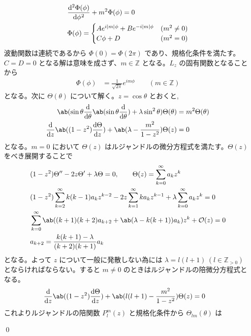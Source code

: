 \documentclass[uplatex,dvipdfmx,a4paper,11pt]{jlreq}
\makeatletter
\newcommand{\ZZ}{\mathbb{Z}}
\theoremstyle{definition}
\renewenvironment{proof}[1][\proofname]{\par
  \normalfont
  \topsep6\p@\@plus6\p@ \trivlist
  \item[\hskip\labelsep{\bfseries #1}\@addpunct{\bfseries}]\ignorespaces\quad\par
}{%
  \qed\endtrivlist\@endpefalse
}
\renewcommand\proofname{証明}
\makeatother
\begin{document}
\begin{proof}
  \begin{align}
     & \diff[2]{\Phi(\phi)}{\phi} + m^2\Phi(\phi) = 0             \\
     & \Phi(\phi) = \begin{cases}
                      Ae^{i|m|\phi} + Be^{-i|m|\phi} & (m^2 \neq 0) \\
                      C\phi + D                      & (m^2 = 0)    \\
                    \end{cases}
  \end{align}
  波動関数は連続であるから $\Phi(0) = \Phi(2\pi)$ であり、規格化条件を満たす。$C = D = 0$ となる解は意味を成さず、$m\in\ZZ$ となる。$L_z$ の固有関数となることから
  \begin{align}
    \Phi(\phi) & = \frac{1}{\sqrt{2\pi}}e^{im\phi} \qquad (m\in\ZZ)
  \end{align}
  となる。次に $\Theta(\theta)$ について解く。$z = \cos\theta$ とおくと,
  \begin{align}
    \ab(\sin\theta\diff{}{\theta}\ab(\sin\theta\diff{}{\theta}) + \lambda \sin^2\theta)\Theta(\theta) & = m^2\Theta(\theta) \\
    \diff{}{z}\ab((1 - z^2)\diff{\Theta}{z}) + \ab(\lambda - \frac{m^2}{1 - z^2})\Theta(z)            & = 0
  \end{align}
  となる。$m = 0$ において $\Theta(z)$ はルジャンドルの微分方程式を満たす。$\Theta(z)$ をべき展開することで
  \begin{align}
     & (1 - z^2)\Theta'' - 2z\Theta' + \lambda\Theta = 0, \qquad \Theta(z) = \sum_{k = 0}^\infty a_kz^k                          \\
     & (1 - z^2)\sum_{k = 2}^\infty k(k-1)a_kz^{k-2} - 2z\sum_{k = 1}^\infty ka_kz^{k-1} + \lambda\sum_{k = 0}^\infty a_kz^k = 0 \\
     & \sum_{k = 0}^\infty \ab((k+1)(k+2)a_{k+2} + \ab(\lambda - k(k+1))a_k)z^k + \mathcal{O}(z) = 0                             \\
     & a_{k+2} = \frac{k(k+1) - \lambda}{(k+2)(k+1)}a_k
  \end{align}
  となる。よって $z$ について一般に発散しない為には $\lambda = l(l+1)\ (l\in\ZZ_{>0})$ とならければならない。すると $m\neq 0$ のときはルジャンドルの陪微分方程式となる。
  \begin{align}
    \diff{}{z}\ab((1 - z^2)\diff{\Theta}{z}) + \ab(l(l+1) - \frac{m^2}{1 - z^2})\Theta(z) & = 0
  \end{align}
  これよりルジャンドルの陪関数 $P_l^m(z)$ と規格化条件から $\Theta_{lm}(\theta)$ は

\end{proof}
\end{document}

